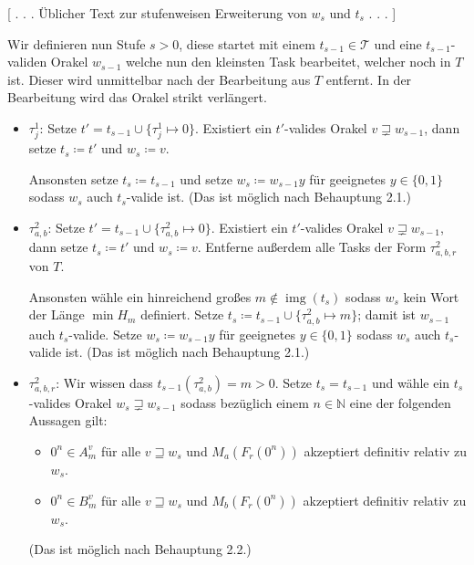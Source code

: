 \documentclass[nofonts]{uebung}
\theoremstyle{definition}
\DeclareMathOperator{\img}{img}
\begin{document}
[ . . . Üblicher Text zur stufenweisen Erweiterung von $w_s$ und $t_s$ . . . ]

Wir definieren nun Stufe $s>0$, diese startet mit einem $t_{s-1}\in\mathcal T$ und eine $t_{s-1}$-validen Orakel $w_{s-1}$ welche nun den kleinsten Task bearbeitet, welcher noch in $T$ ist. Dieser wird unmittelbar nach der Bearbeitung aus $T$ entfernt. In der Bearbeitung wird das Orakel strikt verlängert.
\begin{itemize}

    \item $\tau^1_j$: Setze $t'=t_{s-1}\cup\{\tau^1_j\mapsto 0\}$. Existiert ein $t'$-valides Orakel $v\sqsupsetneq w_{s-1}$, dann setze $t_s\coloneqq t'$ und $w_s\coloneqq v$.

        Ansonsten setze $t_s\coloneqq t_{s-1}$ und setze $w_s\coloneqq w_{s-1}y$ für geeignetes $y\in\{0,1\}$ sodass $w_s$ auch $t_s$-valide ist. (Das ist möglich nach Behauptung 2.1.)

    \item $\tau^2_{a,b}$: Setze $t'=t_{s-1}\cup\{\tau^2_{a,b}\mapsto 0\}$. Existiert ein $t'$-valides Orakel $v\sqsupsetneq w_{s-1}$, dann setze $t_s\coloneqq t'$ und $w_s\coloneqq v$. Entferne außerdem alle Tasks der Form $\tau^2_{a,b,r}$ von $T$.

        Ansonsten wähle ein hinreichend großes $m\not\in \img(t_s)$ sodass $w_s$ kein Wort der Länge $\min H_m$ definiert. Setze $t_s\coloneqq t_{s-1}\cup \{ \tau^2_{a,b}\mapsto m \}$; damit ist $w_{s-1}$ auch $t_s$-valide. Setze $w_s\coloneqq w_{s-1}y$ für geeignetes $y\in\{0,1\}$ sodass $w_s$ auch $t_s$-valide ist. (Das ist möglich nach Behauptung 2.1.)

    \item $\tau^2_{a,b,r}$: Wir wissen dass $t_{s-1}(\tau^2_{a,b})=m>0$. Setze $t_s=t_{s-1}$ und wähle ein $t_s$-valides Orakel $w_s\sqsupsetneq w_{s-1}$ sodass bezüglich einem $n\in\mathbb N$ eine der folgenden Aussagen gilt:
        \begin{itemize}[nosep,endpenalty=10000]
            \item $0^n\in A_m^v$ für alle $v\sqsupseteq w_s$ und $M_a(F_r(0^n))$ akzeptiert definitiv relativ zu $w_s$.
            \item $0^n\in B_m^v$ für alle $v\sqsupseteq w_s$ und $M_b(F_r(0^n))$ akzeptiert definitiv relativ zu $w_s$.
        \end{itemize} (Das ist möglich nach Behauptung 2.2.)


\end{itemize}
\end{document}
